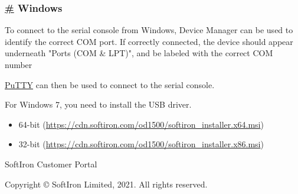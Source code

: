 \hypertarget{windows}{%
\subsubsection{\texorpdfstring{\protect\hyperlink{windows}{\#}
Windows}{\# Windows}}\label{windows}}

To connect to the serial console from Windows, Device Manager can be
used to identify the correct COM port. If correctly connected, the
device should appear underneath "Ports (COM \& LPT)", and be labeled
with the correct COM number

\href{https://www.chiark.greenend.org.uk/~sgtatham/putty/}{PuTTY} can
then be used to connect to the serial console.

For Windows 7, you need to install the USB driver.

\begin{itemize}
\tightlist
\item
  64-bit
  (\url{https://cdn.softiron.com/od1500/softiron_installer.x64.msi})
\item
  32-bit
  (\url{https://cdn.softiron.com/od1500/softiron_installer.x86.msi})
\end{itemize}

SoftIron Customer Portal

Copyright © SoftIron Limited, 2021. All rights reserved.

